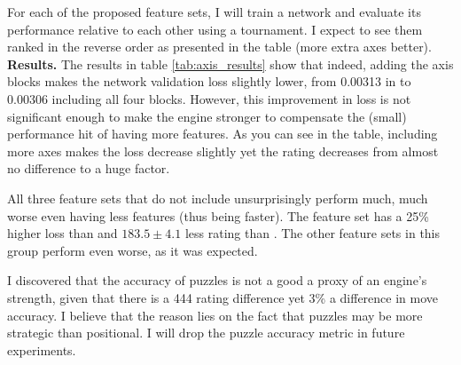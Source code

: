 For each of the proposed feature sets, I will train a network and evaluate its performance relative to each other using a tournament. I expect to see them ranked in the reverse order as presented in the table (more extra axes better). \\

\textbf{Results.} The results in table \ref{tab:axis_results} show that indeed, adding the axis blocks makes the network validation loss slightly lower, from 0.00313 in  to 0.00306 including all four blocks. However, this improvement in loss is not significant enough to make the engine stronger to compensate the (small) performance hit of having more features. As you can see in the table, including more axes makes the loss decrease slightly yet the rating decreases from almost no difference to a huge factor.

All three feature sets that do not include  unsurprisingly perform much, much worse even having less features (thus being faster). The feature set  has a 25\% higher loss than  and $183.5 \pm 4.1$ less rating than . The other feature sets in this group perform even worse, as it was expected.

I discovered that the accuracy of puzzles is not a good a proxy of an engine's strength, given that there is a 444 rating difference yet 3\% a difference in move accuracy. I believe that the reason lies on the fact that puzzles may be more strategic than positional. I will drop the puzzle accuracy metric in future experiments.

